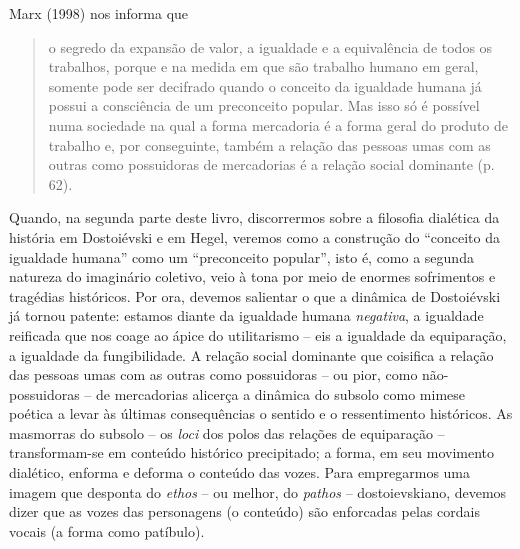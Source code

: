 Marx (1998) nos informa que

\begin{quote}
o segredo da expansão de valor, a igualdade e a equivalência de todos os
trabalhos, porque e na medida em que são trabalho humano em geral,
somente pode ser decifrado quando o conceito da igualdade humana já
possui a consciência de um preconceito popular. Mas isso só é possível
numa sociedade na qual a forma mercadoria é a forma geral do produto de
trabalho e, por conseguinte, também a relação das pessoas umas com as
outras como possuidoras de mercadorias é a relação social dominante (p.
62).
\end{quote}

Quando, na segunda parte deste livro, discorrermos sobre a filosofia
dialética da história em Dostoiévski e em Hegel, veremos como a
construção do ``conceito da igualdade humana'' como um ``preconceito
popular'', isto é, como a segunda natureza do imaginário coletivo, veio
à tona por meio de enormes sofrimentos e tragédias históricos. Por ora,
devemos salientar o que a dinâmica de Dostoiévski já tornou patente:
estamos diante da igualdade humana \emph{negativa}, a igualdade
reificada que nos coage ao ápice do utilitarismo -- eis a igualdade da
equiparação, a igualdade da fungibilidade. A relação social dominante
que coisifica a relação das pessoas umas com as outras como possuidoras
-- ou pior, como não-possuidoras -- de mercadorias alicerça a dinâmica
do subsolo como mimese poética a levar às últimas consequências o
sentido e o ressentimento históricos. As masmorras do subsolo -- os
\emph{loci} dos polos das relações de equiparação -- transformam-se em
conteúdo histórico precipitado; a forma, em seu movimento dialético,
enforma e deforma o conteúdo das vozes. Para empregarmos uma imagem que
desponta do \emph{ethos} -- ou melhor, do \emph{pathos} --
dostoievskiano, devemos dizer que as vozes das personagens (o conteúdo)
são enforcadas pelas cordais vocais (a forma como patíbulo).

